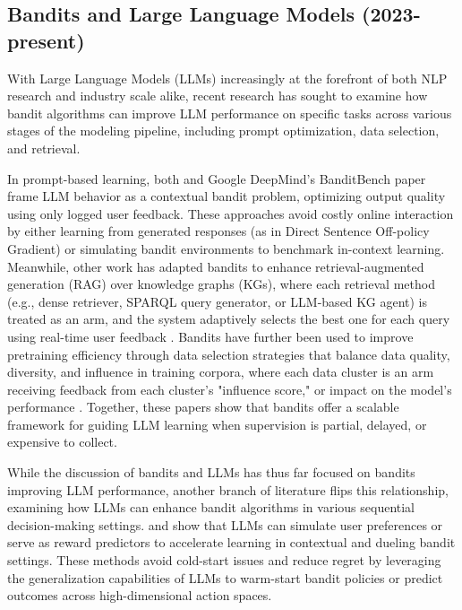 \documentclass[11pt]{article}
\begin{document}
\subsection{Bandits and Large Language Models (2023-present)}

With Large Language Models (LLMs) increasingly at the forefront of both NLP research and industry scale alike, recent research has sought to examine how bandit algorithms can improve LLM performance on specific tasks across various stages of the modeling pipeline, including prompt optimization, data selection, and retrieval.

In prompt-based learning, both \citet{kiyohara2025prompt} and Google DeepMind's BanditBench paper \cite{banditbench-nie2025evolve} frame LLM behavior as a contextual bandit problem, optimizing output quality using only logged user feedback. These approaches avoid costly online interaction by either learning from generated responses (as in Direct Sentence Off-policy Gradient) or simulating bandit environments to benchmark in-context learning. Meanwhile, other work has adapted bandits to enhance retrieval-augmented generation (RAG) over knowledge graphs (KGs), where each retrieval method (e.g., dense retriever, SPARQL query generator, or LLM-based KG agent) is treated as an arm, and the system adaptively selects the best one for each query using real-time user feedback \cite{tang2024adaptingnonstationaryenvironmentsmultiarmed}. Bandits have further been used to improve pretraining efficiency through data selection strategies that balance data quality, diversity, and influence in training corpora, where each data cluster is an arm receiving feedback from each cluster's "influence score," or impact on the model's performance \citep{zhang2025harnessing}. Together, these papers show that bandits offer a scalable framework for guiding LLM learning when supervision is partial, delayed, or expensive to collect.

While the discussion of bandits and LLMs has thus far focused on bandits improving LLM performance, another branch of literature flips this relationship, examining how LLMs can enhance bandit algorithms in various sequential decision-making settings. \citet{alamdari-etal-2024-jump} and \citet{sun2025largelanguagemodelenhancedmultiarmed} show that LLMs can simulate user preferences or serve as reward predictors to accelerate learning in contextual and dueling bandit settings. These methods avoid cold-start issues and reduce regret by leveraging the generalization capabilities of LLMs to warm-start bandit policies or predict outcomes across high-dimensional action spaces.
\end{document}
